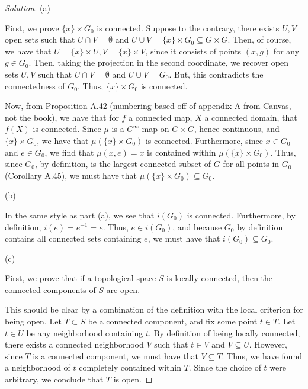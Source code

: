 \documentclass[10pt]{article}
\begin{document}
\begin{proof}[Solution]

(a)

First, we prove $\{ x \} \times G_0$ is connected. Suppose to the contrary, there exists $U, V$ open sets such that $U \cap V = \emptyset$ and $U \cup V = \{ x \} \times G_0 \subseteq G \times G$. Then, of course, we have that $U = \{ x \} \times \overline{U}, V = \{ x \} \times \overline{V}$, since it consists of points $(x,g)$ for any $g \in G_0$. Then, taking the projection in the second coordinate, we recover open sets $\overline{U}, \overline{V}$ such that $\overline{U} \cap \overline{V} = \emptyset$ and $\overline{U} \cup \overline{V} = G_0$. But, this contradicts the connectedness of $G_0$. Thus, $\{ x \} \times G_0$ is connected.

Now, from Proposition A.42 (numbering based off of appendix A from Canvas, not the book), we have that for $f$ a connected map, $X$ a connected domain, that $f(X)$ is connected. Since $\mu$ is a $C^\infty$ map on $G \times G$, hence continuous, and $\{ x \} \times G_0$, we have that  $\mu(\{ x \} \times G_0 )$ is connected. Furthermore, since $x \in G_0$ and $e\in G_0$, we find that $\mu(x, e) = x$ is contained within $\mu(\{ x \} \times G_0 )$. Thus, since $G_0$, by definition, is the largest connected subset of $G$ for all points in $G_0$ (Corollary A.45), we must have that  $\mu(\{ x \} \times G_0 ) \subseteq G_0$.

(b)

In the same style as part (a), we see that $i(G_0)$ is connected. Furthermore, by definition, $i(e) = e^{-1} = e$. Thus, $e \in i(G_0)$, and because $G_0$ by definition contains all connected sets containing $e$, we must have that $i(G_0) \subseteq G_0$.

(c)

First, we prove that if a topological space $S$ is locally connected, then the connected components of $S$ are open.

This should be clear by a combination of the definition with the local criterion for being open. Let $T \subset S$ be a connected component, and fix some point $t \in T$. Let $t \in U$ be any neighborhood containing $t$. By definition of being locally connected, there exists a connected neighborhood $V$ such that $t \in V$ and $V \subseteq U$. However, since $T$ is a connected component, we must have that $V \subseteq T$. Thus, we have found a neighborhood of $t$ completely contained within $T$. Since the choice of $t$ were arbitrary, we conclude that $T$ is open.


\end{proof}
\end{document}
